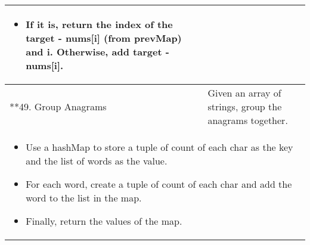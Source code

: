 \begin{summary}
\begin{center}
\begin{tabular}{ll}
{\begin{itemize}
\begin{itemize}
                        \item If it is, return the index of the target - nums[i] (from prevMap) and i. Otherwise, add target - nums[i].
                    \end{itemize}
                \end{itemize}
            } \\
            \midrule
            **49. Group Anagrams & Given an array of strings, group the anagrams together. \\
            \multicolumn{2}{p{\linewidth}}{
                \begin{itemize}
                    \item Use a hashMap to store a tuple of count of each char as the key and the list of words as the value.
                    \item For each word, create a tuple of count of each char and add the word to the list in the map.
                    \item Finally, return the values of the map.
                \end{itemize}
            } \\
            \midrule
            
            \bottomrule
        \end{tabular}
    \end{center}
\end{summary}